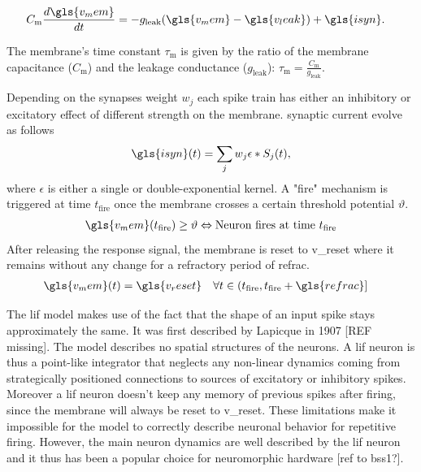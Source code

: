 \begin{align}
\label{lifeq}
C_{\text{m}} \frac{d\gls{v_mem}}{dt} &= -g_{\text{leak}} (\gls{v_mem} - \gls{v_leak}) + \gls{isyn}.
\end{align}

The membrane's time constant $\tau_\text{m}$ is given by the ratio of the membrane capacitance ($C_{\text{m}}$) and the leakage conductance ($g_{\text{leak}}$): $\tau_\text{m} = \frac{C_{\text{m}}}{g_{\text{leak}}}$. 

Depending on the synapses weight $w_j$ each spike train has either an inhibitory or excitatory effect of different strength on the membrane.  synaptic current evolve as follows
\begin{equation}
\gls{isyn}(t) = \sum_j w_j \epsilon \ast S_j(t), 
\end{equation}
where $\epsilon$ is either a single or double-exponential kernel. %
A "fire" mechanism is triggered at time $t_{\text{fire}}$ once the membrane crosses a certain threshold potential $\mathcal{\vartheta}$. 
\begin{align}
\gls{v_mem}(t_{\text{fire}}) &\ge \vartheta \Leftrightarrow \text{Neuron fires at time } t_{\text{fire}} \\
\end{align}
After releasing the response signal, the membrane is reset to \gls{v_reset} where it remains without any change for a refractory period of \gls{refrac}. 
\begin{align}
\gls{v_mem}(t) &= \gls{v_reset} \quad \forall t \in (t_{\text{fire}}, t_{\text{fire}} + \gls{refrac}] 
\end{align}


The \gls{lif} model makes use of the fact that the shape of an input spike stays approximately the same. It was first described by Lapicque in 1907 [REF missing]. The model describes no spatial structures of the neurons. A \gls{lif} neuron is thus a point-like integrator that neglects any non-linear dynamics coming from strategically positioned connections to sources of excitatory or inhibitory spikes. Moreover a \gls{lif} neuron doesn't keep any memory of previous spikes after firing, since the membrane will always be reset to \gls{v_reset}. These limitations make it impossible for the model to correctly describe neuronal behavior for repetitive firing. However, the main neuron dynamics are well described by the \gls{lif} neuron and it thus has been a popular choice for neuromorphic hardware [ref to \gls{bss1}?].\\

